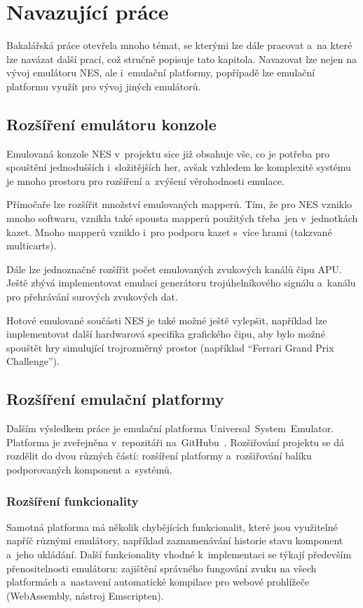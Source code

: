 \chapter{Navazující práce}
Bakalářská práce otevřela mnoho témat, se kterými lze dále pracovat a~na které lze navázat další prací, což stručně popisuje tato kapitola. Navazovat lze nejen na vývoj emulátoru NES, ale i~emulační platformy, popřípadě lze emulační platformu využít pro vývoj jiných emulátorů.

\section{Rozšíření emulátoru konzole}
Emulovaná konzole NES v~projektu sice již obsahuje vše, co je potřeba pro spouštění jednodušších i~složitějších her, avšak vzhledem ke komplexitě systému je mnoho prostoru pro rozšíření a~zvýšení věrohodnosti emulace.

Přímočaře lze rozšířit množství emulovaných mapperů. Tím, že pro NES vzniklo mnoho softwaru, vznikla také spousta mapperů použitých třeba~jen v~jednotkách kazet. Mnoho mapperů vzniklo i~pro podporu kazet s~více hrami (takzvané multicarts).

Dále lze jednoznačně rozšířit počet emulovaných zvukových kanálů čipu APU. Ještě zbývá implementovat emulaci generátoru trojúhelníkového signálu a~kanálu pro přehrávání surových zvukových dat.

Hotové emulované součásti NES je také možné ještě vylepšit, například lze implementovat další hardwarová specifika grafického čipu, aby bylo možné spouštět hry simulující trojrozměrný prostor (například \enquote{Ferrari Grand Prix Challenge}).

\section{Rozšíření emulační platformy}
Dalším výsledkem práce je emulační platforma Universal~System~Emulator. Platforma je zveřejněna v~repozitáři na~GitHubu~\cite{Golasowski2023:use}. Rozšiřování projektu se dá rozdělit do dvou různých částí: rozšíření platformy a~rozšiřování balíku podporovaných komponent a~systémů.

\subsection{Rozšíření funkcionality}
Samotná platforma má několik chybějících funkcionalit, které jsou využitelné napříč různými emulátory, například zaznamenávání historie stavu komponent a~jeho ukládání. Další funkcionality vhodné k~implementaci se týkají především přenositelnosti emulátoru: zajištění správného fungování zvuku na všech platformách a~nastavení automatické kompilace pro webové prohlížeče (WebAssembly, nástroj Emscripten).

